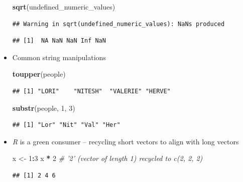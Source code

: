 \documentclass[]{article}
\newenvironment{Shaded}{\begin{snugshade}}{\end{snugshade}}
\newcommand{\KeywordTok}[1]{\textcolor[rgb]{0.13,0.29,0.53}{\textbf{#1}}}
\newcommand{\DecValTok}[1]{\textcolor[rgb]{0.00,0.00,0.81}{#1}}
\newcommand{\StringTok}[1]{\textcolor[rgb]{0.31,0.60,0.02}{#1}}
\newcommand{\CommentTok}[1]{\textcolor[rgb]{0.56,0.35,0.01}{\textit{#1}}}
\newcommand{\OperatorTok}[1]{\textcolor[rgb]{0.81,0.36,0.00}{\textbf{#1}}}
\newcommand{\NormalTok}[1]{#1}
\theoremstyle{definition}
\theoremstyle{definition}
\theoremstyle{remark}
\begin{document}
\begin{itemize}
\begin{Shaded}
\begin{Highlighting}[]
\KeywordTok{sqrt}\NormalTok{(undefined_numeric_values)}
\end{Highlighting}
\end{Shaded}

\begin{verbatim}
## Warning in sqrt(undefined_numeric_values): NaNs produced
\end{verbatim}

\begin{verbatim}
## [1]  NA NaN NaN Inf NaN
\end{verbatim}
\item
  Common string manipulations

\begin{Shaded}
\begin{Highlighting}[]
\KeywordTok{toupper}\NormalTok{(people)}
\end{Highlighting}
\end{Shaded}

\begin{verbatim}
## [1] "LORI"    "NITESH"  "VALERIE" "HERVE"
\end{verbatim}

\begin{Shaded}
\begin{Highlighting}[]
\KeywordTok{substr}\NormalTok{(people, }\DecValTok{1}\NormalTok{, }\DecValTok{3}\NormalTok{)}
\end{Highlighting}
\end{Shaded}

\begin{verbatim}
## [1] "Lor" "Nit" "Val" "Her"
\end{verbatim}
\item
  \emph{R} is a green consumer -- recycling short vectors to align with
  long vectors

\begin{Shaded}
\begin{Highlighting}[]
\NormalTok{x <-}\StringTok{ }\DecValTok{1}\OperatorTok{:}\DecValTok{3}
\NormalTok{x }\OperatorTok{*}\StringTok{ }\DecValTok{2}            \CommentTok{# '2' (vector of length 1) recycled to c(2, 2, 2)}
\end{Highlighting}
\end{Shaded}

\begin{verbatim}
## [1] 2 4 6
\end{verbatim}


\end{itemize}
\end{document}
